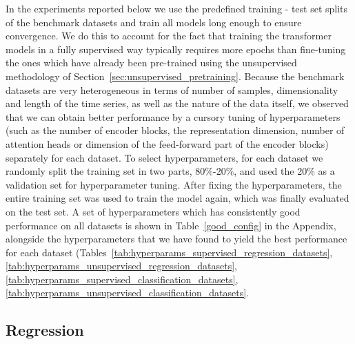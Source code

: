 \documentclass{article} \usepackage{iclr2021_conference,times}
\begin{document}
In the experiments reported below we use the predefined training - test set splits of the benchmark datasets and train all models long enough to ensure convergence. We do this to account for the fact that training the transformer models in a fully supervised way typically requires more epochs than fine-tuning the ones which have already been pre-trained using the unsupervised methodology of Section~\ref{sec:unsupervised_pretraining}. Because the benchmark datasets are very heterogeneous in terms of number of samples, dimensionality and length of the time series, as well as the nature of the data itself, we observed that we can obtain better performance by a cursory tuning of hyperparameters (such as the number of encoder blocks, the representation dimension, number of attention heads or dimension of the feed-forward part of the encoder blocks) separately for each dataset. To select hyperparameters, for each dataset we randomly split the training set in two parts, 80\%-20\%, and used the 20\% as a validation set for hyperparameter tuning. After fixing the hyperparameters, the entire training set was used to train the model again, which was finally evaluated on the test set. A set of hyperparameters which has consistently good performance on all datasets is shown in Table~\ref{good_config} in the Appendix, alongside the hyperparameters that we have found to yield the best performance for each dataset (Tables~\ref{tab:hyperparams_supervised_regression_datasets}, \ref{tab:hyperparams_unsupervised_regression_datasets}, \ref{tab:hyperparams_supervised_classification_datasets}, \ref{tab:hyperparams_unsupervised_classification_datasets}. 

\subsection{Regression} \label{sec:regression}
\end{document}

